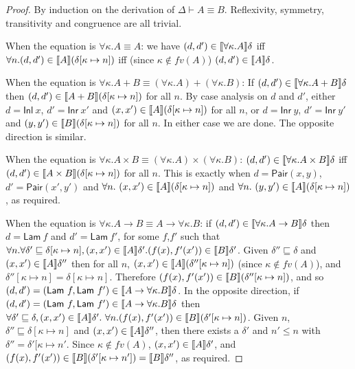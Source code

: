 \begin{proof}
  By induction on the derivation of $\Delta \vdash A \equiv
  B$. Reflexivity, symmetry, transitivity and congruence are all
  trivial. 

  When the equation is $\forall \kappa. A \equiv A$: we have $(d,d')
  \in \llbracket \forall \kappa. A \rrbracket\delta$ iff $\forall n. (d,d') \in
  \llbracket A \rrbracket(\delta[\kappa\mapsto n])$ iff (since $\kappa \not\in
  \mathit{fv}(A)$) $(d,d') \in \llbracket A \rrbracket\delta$.  

  When the equation is $\forall \kappa. A + B \equiv (\forall
  \kappa. A) + (\forall \kappa. B)$: If $(d,d') \in \llbracket \forall
    \kappa. A + B \rrbracket\delta$ then $(d,d') \in \llbracket A + B \rrbracket(\delta[\kappa
  \mapsto n])$ for all $n$. By case analysis on $d$ and $d'$, either
  $d = \mathsf{Inl}\ x$, $d' = \mathsf{Inr}\ x'$ and $(x,x') \in
  \llbracket A \rrbracket(\delta[\kappa \mapsto n])$ for all $n$, or $d =
  \mathsf{Inr}\ y$, $d' = \mathsf{Inr}\ y'$ and $(y,y') \in
  \llbracket B \rrbracket(\delta[\kappa\mapsto n])$ for all $n$. In either case we are
  done. The opposite direction is similar.

  When the equation is $\forall \kappa. A \times B \equiv (\forall
  \kappa. A) \times (\forall \kappa. B)$: $(d,d') \in \llbracket \forall
    \kappa. A \times B \rrbracket\delta$ iff $(d,d') \in \llbracket A \times
    B \rrbracket(\delta[\kappa \mapsto n])$ for all $n$. This is exactly when $d
  = \mathsf{Pair}(x,y)$, $d' = \mathsf{Pair}(x',y')$ and $\forall n.\
  (x,x') \in \llbracket A \rrbracket(\delta[\kappa \mapsto n])$ and $\forall n.\
  (y,y') \in \llbracket A \rrbracket(\delta[\kappa \mapsto n])$, as required.

  When the equation is $\forall \kappa. A \to B \equiv A \to \forall
  \kappa. B$: if $(d,d') \in \llbracket \forall \kappa.A \to B \rrbracket\delta$ then
  $d = \mathsf{Lam}\ f$ and $d' = \mathsf{Lam}\ f'$, for some $f$,$f'$
  such that $\forall n. \forall \delta' \sqsubseteq \delta[\kappa
  \mapsto n], (x,x') \in \llbracket A \rrbracket\delta'. (f(x),f'(x')) \in
  \llbracket B \rrbracket\delta'$. Given $\delta'' \sqsubseteq \delta$ and $(x,x') \in
  \llbracket A \rrbracket\delta''$ then for all $n$, $(x,x') \in
  \llbracket A \rrbracket(\delta''[\kappa \mapsto n])$ (since $\kappa \not\in
  \mathit{fv}(A)$), and $\delta''[\kappa \mapsto n] = \delta[\kappa
  \mapsto n]$. Therefore $(f(x),f'(x')) \in \llbracket B \rrbracket(\delta''[\kappa
  \mapsto n])$, and so $(d,d') = (\mathsf{Lam}\ f, \mathsf{Lam}\ f')
  \in \llbracket A \to \forall \kappa. B \rrbracket\delta$. In the opposite direction,
  if $(d,d') = (\mathsf{Lam}\ f, \mathsf{Lam}\ f') \in \llbracket A \to
    \forall \kappa.B \rrbracket\delta$ then $\forall \delta' \sqsubseteq \delta,
  (x,x') \in \llbracket A \rrbracket\delta'.\ \forall n. (f(x),f'(x')) \in
  \llbracket B \rrbracket(\delta'[\kappa \mapsto n])$. Given $n$, $\delta''
  \sqsubseteq \delta[\kappa \mapsto n]$ and $(x,x') \in
  \llbracket A \rrbracket\delta''$, then there exists a $\delta'$ and $n' \leq n$ with
  $\delta'' = \delta'[\kappa \mapsto n'$. Since $\kappa \not\in
  \mathit{fv}(A)$, $(x,x') \in \llbracket A \rrbracket\delta'$, and $(f(x),f'(x')) \in
  \llbracket B \rrbracket(\delta'[\kappa \mapsto n']) = \llbracket B \rrbracket\delta''$, as
  required.


\end{proof}
